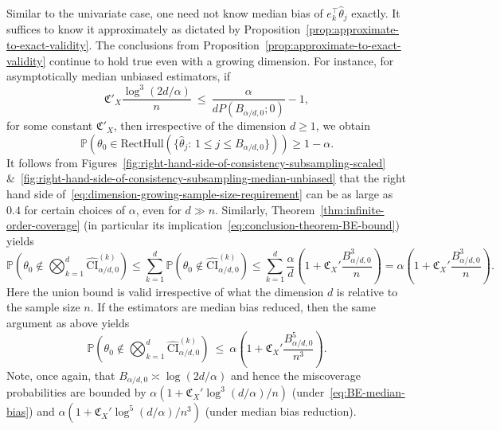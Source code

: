\documentclass{article}
\numberwithin{myalgctr}{section}
\begin{document}
Similar to the univariate case, one need not know median bias of $e_k^{\top}\widehat{\theta}_j$ exactly. It suffices to know it approximately as dictated by Proposition~\ref{prop:approximate-to-exact-validity}. The conclusions from Proposition~\ref{prop:approximate-to-exact-validity} continue to hold true even with a growing dimension. For instance, for asymptotically median unbiased estimators, if
\begin{equation}\label{eq:dimension-growing-sample-size-requirement}
\mathfrak{C}'_X\frac{\log^3(2d/\alpha)}{n} ~\le~ \frac{\alpha}{dP(B_{\alpha/d,0}; 0)} - 1,
\end{equation}
for some constant $\mathfrak{C}'_X$, then irrespective of the dimension $d\ge1$, we obtain
\[
\mathbb{P}\left(\theta_0 \in \mbox{RectHull}(\{\widehat{\theta}_j:\,1\le j\le B_{\alpha/d,0}\})\right) \ge 1 - \alpha.
\] 
It follows from Figures~\ref{fig:right-hand-side-of-consistency-subsampling-scaled} \&~\ref{fig:right-hand-side-of-consistency-subsampling-median-unbiased} that the right hand side of~\eqref{eq:dimension-growing-sample-size-requirement} can be as large as $0.4$ for certain choices of $\alpha$, even for $d\gg n$. Similarly, Theorem~\ref{thm:infinite-order-coverage} (in particular its implication~\eqref{eq:conclusion-theorem-BE-bound}) yields 
\begin{equation}\label{eq:usual-median-bias-union-bnd}
\mathbb{P}\left(\theta_0 \notin \bigotimes_{k=1}^d \widehat{\mathrm{CI}}_{\alpha/d,0}^{(k)}\right) \le \sum_{k=1}^d \mathbb{P}\left(\theta_0 \notin \widehat{\mathrm{CI}}_{\alpha/d,0}^{(k)}\right) \le \sum_{k=1}^d \frac{\alpha}{d}\left(1 + \mathfrak{C}_X'\frac{B_{\alpha/d,0}^3}{n}\right) = \alpha\left(1 + \mathfrak{C}_X'\frac{B_{\alpha/d,0}^3}{n}\right).
\end{equation}
Here the union bound is valid irrespective of what the dimension $d$ is relative to the sample size $n$. If the estimators are median bias reduced, then the same argument as above yields
\begin{equation}\label{eq:less-median-bias-union-bnd}
\mathbb{P}\left(\theta_0 \notin \bigotimes_{k=1}^d \widehat{\mathrm{CI}}_{\alpha/d,0}^{(k)}\right) ~\le~ \alpha\left(1 + \mathfrak{C}_X'\frac{B_{\alpha/d,0}^5}{n^3}\right).
\end{equation}
Note, once again, that $B_{\alpha/d,0} \asymp \log(2d/\alpha)$ and hence the miscoverage probabilities are bounded by $\alpha(1 + \mathfrak{C}_X'\log^3(d/\alpha)/n)$ (under~\eqref{eq:BE-median-bias}) and $\alpha(1 +  \mathfrak{C}_X'\log^5(d/\alpha)/n^3)$ (under median bias reduction).
\end{document}
